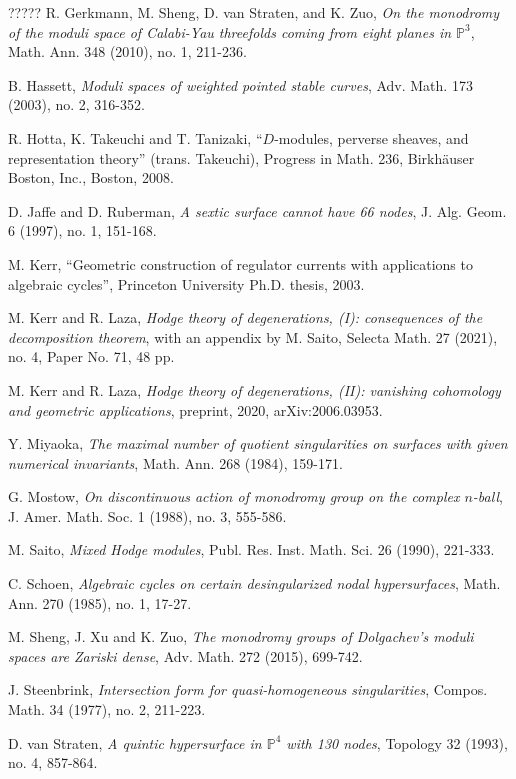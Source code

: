 \documentclass[12pt,letterpaper,english]{amsart}
\numberwithin{equation}{section}
\numberwithin{figure}{section}
\theoremstyle{plain}
\theoremstyle{remark}
\theoremstyle{definition}
\theoremstyle{definition}
\theoremstyle{plain}
\theoremstyle{plain}
\theoremstyle{plain}
\theoremstyle{plain}
\theoremstyle{definition}
\def\PP{\mathbb{P}}
\theoremstyle{definition}
\begin{document}
\begin{thebibliography}{?????}
 R. Gerkmann, M. Sheng, D. van Straten, and K. Zuo, \emph{On the monodromy of the moduli space of Calabi-Yau threefolds coming from eight planes in $\PP^3$}, Math. Ann. 348 (2010), no. 1, 211-236.

 B. Hassett, \emph{Moduli spaces of weighted pointed stable curves}, Adv. Math. 173 (2003), no. 2, 316-352.

 R. Hotta, K. Takeuchi and T. Tanizaki, ``$D$-modules, perverse sheaves, and representation theory'' (trans. Takeuchi), Progress in Math. 236, Birkh\"auser Boston, Inc., Boston, 2008.

 D. Jaffe and D. Ruberman, \emph{A sextic surface cannot have 66 nodes}, J. Alg. Geom. 6 (1997), no. 1, 151-168.

 M. Kerr, ``Geometric construction of regulator currents with applications to algebraic cycles'', Princeton University Ph.D. thesis, 2003.

 M. Kerr and R. Laza, \emph{Hodge theory of degenerations, (I): consequences of the decomposition theorem}, with an appendix by M. Saito, Selecta Math. 27 (2021), no. 4, Paper No. 71, 48 pp.

 M. Kerr and R. Laza, \emph{Hodge theory of degenerations, (II): vanishing cohomology and geometric applications}, preprint, 2020, arXiv:2006.03953.

 Y. Miyaoka, \emph{The maximal number of quotient singularities on surfaces with given numerical invariants}, Math. Ann. 268 (1984), 159-171.

 G. Mostow, \emph{On discontinuous action of monodromy group on the complex $n$-ball}, J. Amer. Math. Soc. 1 (1988), no. 3, 555-586.

 M. Saito, \emph{Mixed Hodge modules}, Publ. Res. Inst. Math. Sci. 26 (1990), 221-333.

 C. Schoen, \emph{Algebraic cycles on certain desingularized nodal hypersurfaces}, Math. Ann. 270 (1985), no. 1, 17-27.

 M. Sheng, J. Xu and K. Zuo, \emph{The monodromy groups of Dolgachev's moduli spaces are Zariski dense}, Adv. Math. 272 (2015), 699-742.

 J. Steenbrink, \emph{Intersection form for quasi-homogeneous singularities}, Compos. Math. 34 (1977), no. 2, 211-223.

 D. van Straten, \emph{A quintic hypersurface in $\PP^4$ with 130 nodes}, Topology 32 (1993), no. 4, 857-864.


\end{thebibliography}
\end{document}
